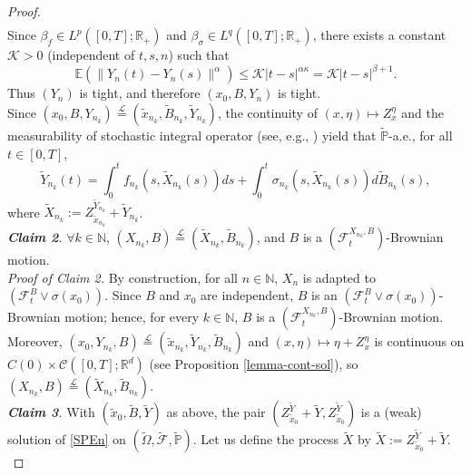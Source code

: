\documentclass[preprint,12pt]{elsarticle}
\newcommand{\R}{\mathbb{R}}
\newcommand{\N}{\mathbb{N}}
\theoremstyle{plain}
\theoremstyle{definition}
\theoremstyle{remark}
\begin{document}
\begin{proof}
\begin{equation*}
\begin{aligned}
            \end{aligned}
        \end{equation*}
        Since $\beta_f\in L^p([0,T];\R_+)$ and  $\beta_\sigma\in L^q([0,T];\R_+)$, there exists a constant $\mathcal{K}>0$ (independent of $t,s,n$) such that 
		\begin{equation*}
				\mathbb{E}(\|Y_n(t) - Y_n(s)\|^\alpha)
				\leq  \mathcal{K}|t-s|^{\alpha\kappa} = \mathcal{K}|t-s|^{\beta+1}.
		\end{equation*}
		Thus $(Y_n)$ is tight, and therefore $(x_0,B,Y_n)$ is tight.\\ 
		Since $(x_0,B,Y_{n_k})\stackrel{\mathscr{L}}{=} (\tilde{x}_{n_k},\tilde B_{n_k},\tilde{Y}_{n_k})$, the continuity of $(x,\eta)\mapsto Z_{x}^\eta$ and the measurability of stochastic integral operator (see, e.g., \cite[Theorem 3]{WOS:A1995QX25200002}) yield that $\tilde{\mathbb{P}}$-a.e., for all $t\in [0,T]$,
        \begin{equation}\label{eqn-Ynk-bfr-limit}
            \tilde{Y}_{n_k}(t) = \int_{0}^t f_{n_k}(s,\tilde{X}_{n_k}(s))ds + \int_{0}^t \sigma_{n_k}(s,\tilde{X}_{n_k}(s))d\tilde{B}_{n_k}(s),
        \end{equation}
		where $\tilde{X}_{n_k} := Z^{\tilde{Y}_{n_k}}_{\tilde{x}_{n_k}} + \tilde{Y}_{n_k}$.\\
        \emph{\textbf{Claim 2}.} $\forall k\in \N$, $(X_{n_k},B) \stackrel{\mathscr{L}}{=} (\tilde{X}_{n_k},\tilde{B}_{n_k})$, and $B$ is a $(\mathcal{F}^{X_{n_k},B}_t)$-Brownian motion.\\ 
	\emph{Proof of Claim 2.}
        By construction, for all $n\in \N$, $X_n$ is adapted to $(\mathcal{F}^{B}_t\vee\sigma(x_0))$. Since $B$ and $x_0$ are independent, $B$ is an $(\mathcal{F}_t^B\vee \sigma(x_0))$-Brownian motion; hence,  for every $k\in \N$, $B$ is a $(\mathcal{F}^{X_{n_k},B}_t)$-Brownian motion. Moreover, $(x_0,Y_{n_k},B) \stackrel{\mathscr{L}}{=} (\tilde{x}_{n_k},\tilde{Y}_{n_k},\tilde{B}_{n_k})$ and $(x,\eta)\mapsto \eta + Z^{\eta}_x$ is continuous on $C(0)\times \mathcal{C}([0,T];\R^d)$ (see Proposition \ref{lemma-cont-sol}), so  $(X_{n_k},B) \stackrel{\mathscr{L}}{=} (\tilde{X}_{n_k},\tilde{B}_{n_k})$.\\
		\emph{\textbf{Claim 3}.} With $(\tilde{x}_0,\tilde{B},\tilde{Y})$ as above, the pair $(Z^{\tilde{Y}}_{\tilde{x}_0} + \tilde{Y}, Z^{\tilde{Y}}_{\tilde{x}_0})$ is a (weak) solution of \eqref{SPEn} on $(\tilde{\Omega},\tilde{\mathcal{F}},\tilde{\mathbb{P}})$. Let us define the process $\tilde{X}$ by $\tilde{X} := Z^{\tilde{Y}}_{\tilde{x}_0} + \tilde{Y}$.\\ 

\end{proof}
\end{document}
